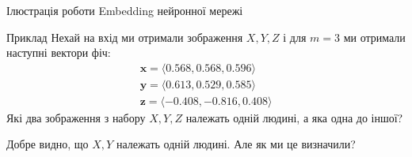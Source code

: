 \documentclass{zkdl-presentation-template}
\begin{document}
    \begin{frame}{Ілюстрація роботи Embedding нейронної мережі}
        \begin{exampleblock}{Приклад}
            Нехай на вхід ми отримали зображення $X,Y,Z$ і для $m=3$ ми отримали наступні вектори фіч:
            \begin{gather*}
                \boldsymbol{x} = \langle 0.568, 0.568, 0.596\rangle \\
                \boldsymbol{y} = \langle 0.613, 0.529, 0.585\rangle \\
                \boldsymbol{z} = \langle -0.408, -0.816, 0.408\rangle
            \end{gather*}
            Які два зображення з набору $X,Y,Z$ належать одній людині, а яка одна до іншої?
        \end{exampleblock}
        Добре видно, що $X,Y$ належать одній людині. Але як ми це визначили? 
    \end{frame}
\end{document}
